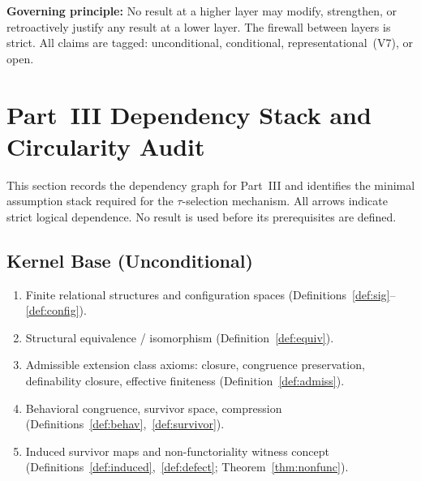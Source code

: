 \documentclass[11pt,a4paper]{article}
\theoremstyle{definition}
\theoremstyle{remark}
\begin{document}
\medskip\noindent\textbf{Governing principle:} No result at a higher layer may modify, strengthen, or retroactively justify any result at a lower layer. The firewall between layers is strict. All claims are tagged: unconditional, conditional, representational~(V7), or open.


\section{Part~III Dependency Stack and Circularity Audit}\label{app:depstack}

This section records the dependency graph for Part~III and identifies the minimal assumption stack required for the $\tau$-selection mechanism. All arrows indicate strict logical dependence. No result is used before its prerequisites are defined.

\subsection*{Kernel Base (Unconditional)}
\begin{enumerate}[label=\textbf{K\arabic*.}]
  \item Finite relational structures and configuration spaces (Definitions~\ref{def:sig}--\ref{def:config}).
  \item Structural equivalence / isomorphism (Definition~\ref{def:equiv}).
  \item Admissible extension class axioms: closure, congruence preservation, definability closure, effective finiteness (Definition~\ref{def:admiss}).
  \item Behavioral congruence, survivor space, compression (Definitions~\ref{def:behav},~\ref{def:survivor}).
  \item Induced survivor maps and non-functoriality witness concept (Definitions~\ref{def:induced},~\ref{def:defect}; Theorem~\ref{thm:nonfunc}).
\end{enumerate}
\end{document}
